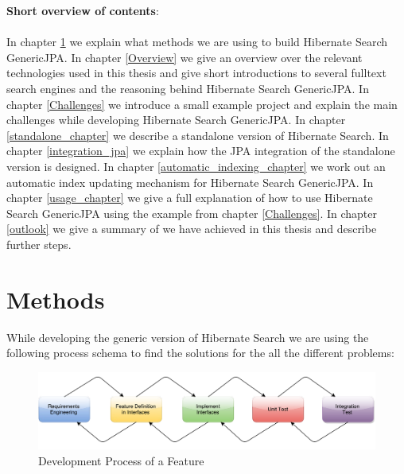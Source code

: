 \pagebreak

\noindent
\textbf{Short overview of contents}:
\\\\
\noindent
In chapter \ref{Methods} we explain what methods we are using to build Hibernate Search GenericJPA. In chapter \ref{Overview} we give an overview over the relevant technologies used in this thesis and give short introductions to several fulltext search engines and the reasoning behind Hibernate Search GenericJPA. In chapter \ref{Challenges} we introduce a small example project and explain the main challenges while developing Hibernate Search GenericJPA. In chapter \ref{standalone_chapter} we describe a standalone version of Hibernate Search. In chapter \ref{integration_jpa} we explain how the JPA integration of the standalone version is designed. In chapter \ref{automatic_indexing_chapter} we work out an automatic index updating mechanism for Hibernate Search GenericJPA. In chapter \ref{usage_chapter} we give a full explanation of how to use Hibernate Search GenericJPA using the example from chapter \ref{Challenges}. In chapter \ref{outlook} we give a summary of we have achieved in this thesis and describe further steps.

\pagebreak

\pagebreak

\section{Methods} \label{Methods}

While developing the generic version of Hibernate Search we are using the following process schema to find the solutions for the all the different problems:

\begin{figure}[ht]
	\centering
	\includegraphics[scale=0.52]{images/work_process.pdf}
	\caption{Development Process of a Feature}
	\label{development_process_of_a_feature}
\end{figure}

